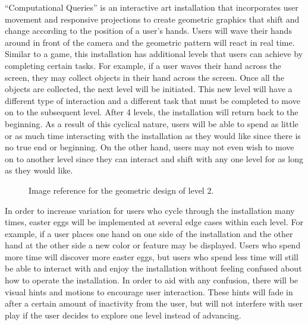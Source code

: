 \documentclass[10pt,twocolumn]{article}
\begin{document}
``Computational Queries'' is an interactive art installation that incorporates user movement and responsive projections to create geometric graphics that shift and change according to the position of a user's hands.  Users will wave their hands around in front of the camera and the geometric pattern will react in real time. Similar to a game, this installation has additional levels that users can achieve by completing certain tasks.  For example, if a user waves their hand across the screen, they may collect objects in their hand across the screen.  Once all the objects are collected, the next level will be initiated.  This new level will have a different type of interaction and a different task that must be completed to move on to the subsequent level.  After 4 levels, the installation will return back to the beginning.  As a result of this cyclical nature, users will be able to spend as little or as much time interacting with the installation as they would like since there is no true end or beginning. On the other hand, users may not even wish to move on to another level since they can interact and shift with any one level for as long as they would like.  

\begin{figure}[hbh]
\begin{center}
\vspace{.5cm}
\caption{Image reference for the geometric design of level 2.}
\label{fig:geometric}
\end{center}
\end{figure} 

In order to increase variation for users who cycle through the installation many times, easter eggs will be implemented at several edge cases within each level.  For example, if a user places one hand on one side of the installation and the other hand at the other side a new color or feature may be displayed.  Users who spend more time will discover more easter eggs, but users who spend less time will still be able to interact with and enjoy the installation without feeling confused about how to operate the installation.  In order to aid with any confusion, there will be visual hints and motions to encourage user interaction. These hints will fade in after a certain amount of inactivity from the user, but will not interfere with user play if the user decides to explore one level instead of advancing. 
\end{document}

